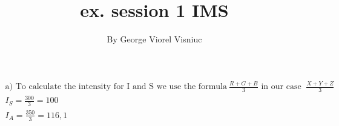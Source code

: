 \documentclass{article}
\begin{document}
\title{ex. session 1 IMS}
\author{By George Viorel Visniuc}
\maketitle



\section{}


\begin{gather}
\text{a) To calculate the intensity for I and S we use the formula}\ \frac{R + G + B}{3} \text{ in our case }\ \frac{X + Y + Z}{3} \\
I_{S} = \frac{300}{3} = 100 \\
I_{A} = \frac{350}{3} = 116,1
\end{gather}
\end{document}
